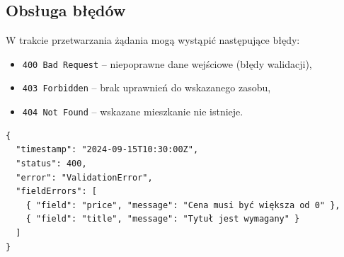 \documentclass[11pt, a4paper]{article}
\begin{document}
\subsection{Obsługa błędów}

W trakcie przetwarzania żądania mogą wystąpić następujące błędy:

\begin{itemize}
    \item \texttt{400 Bad Request} – niepoprawne dane wejściowe (błędy walidacji),
    \item \texttt{403 Forbidden} – brak uprawnień do wskazanego zasobu,
    \item \texttt{404 Not Found} – wskazane mieszkanie nie istnieje.
\end{itemize}

\begin{lstlisting}[style=json,caption={Przykładowa odpowiedź — błąd walidacji}]
{
  "timestamp": "2024-09-15T10:30:00Z",
  "status": 400,
  "error": "ValidationError",
  "fieldErrors": [
    { "field": "price", "message": "Cena musi być większa od 0" },
    { "field": "title", "message": "Tytuł jest wymagany" }
  ]
}
\end{lstlisting}

\end{document}
